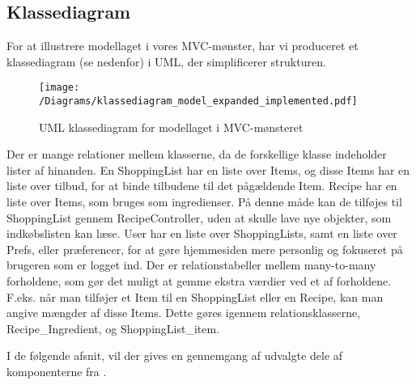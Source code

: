 \subsection{Klassediagram}
For at illustrere modellaget i vores MVC-mønster, har vi produceret et klassediagram (se  nedenfor) i UML, der simplificerer strukturen.

\begin{figure}[H]
\centering
\texttt{[image: /Diagrams/klassediagram\_model\_expanded\_implemented.pdf]}
\caption{UML klassediagram for modellaget i MVC-mønsteret}\label{diagram:klassediagram}
\end{figure}

Der er mange relationer mellem klasserne, da de forskellige klasse indeholder lister af hinanden.
En ShoppingList har en liste over Items, og disse Items har en liste over tilbud, for at binde tilbudene til det pågældende Item.
Recipe har en liste over Items, som bruges som ingredienser. 
På denne måde kan de tilføjes til ShoppingList gennem RecipeController, uden at skulle lave nye objekter, som indkøbslisten kan læse.
User har en liste over ShoppingLists, samt en liste over Prefs, eller præferencer, for at gøre hjemmesiden mere personlig og fokuseret på brugeren som er logget ind.
Der er relationstabeller mellem many-to-many forholdene, som gør det muligt at gemme ekstra værdier ved et af forholdene. 
F.eks. når man tilføjer et Item til en ShoppingList eller en Recipe, kan man angive mængder af disse Items.
Dette gøres igennem relationsklasserne, Recipe_Ingredient, og ShoppingList_item.

I de følgende afsnit, vil der gives en gennemgang af udvalgte dele af komponenterne fra .

